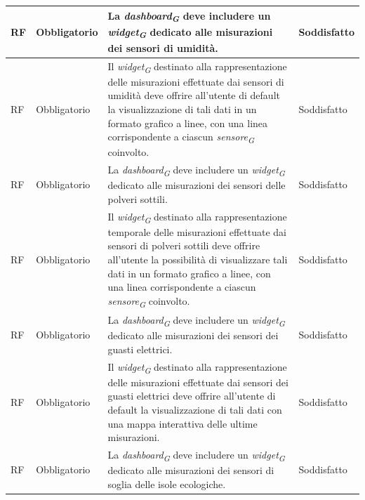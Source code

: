 \begin{longtable}{|C{1.5cm}|C{2cm}|L{5cm}|C{2cm}|}
    \hline
     RF & Obbligatorio & La \textit{dashboard}\textsubscript{\textit{G}} deve includere un \textit{widget}\textsubscript{\textit{G}} dedicato alle misurazioni dei sensori di umidità.& Soddisfatto \\
    \hline
     RF & Obbligatorio &Il \textit{widget}\textsubscript{\textit{G}} destinato alla rappresentazione delle misurazioni effettuate dai sensori di umidità deve offrire all'utente di default la visualizzazione di tali dati in un formato grafico a linee, con una linea corrispondente a ciascun \textit{sensore}\textsubscript{\textit{G}} coinvolto.& Soddisfatto \\
    
    \hline
     RF & Obbligatorio & La \textit{dashboard}\textsubscript{\textit{G}} deve includere un \textit{widget}\textsubscript{\textit{G}} dedicato alle misurazioni dei sensori delle polveri sottili.& Soddisfatto \\
    
    \hline
     RF & Obbligatorio &Il \textit{widget}\textsubscript{\textit{G}} destinato alla rappresentazione temporale delle misurazioni effettuate dai sensori di polveri sottili deve offrire all'utente la possibilità di visualizzare tali dati in un formato grafico a linee, con una linea corrispondente a ciascun \textit{sensore}\textsubscript{\textit{G}} coinvolto.& Soddisfatto \\
    
    \hline
     RF & Obbligatorio & La \textit{dashboard}\textsubscript{\textit{G}} deve includere un \textit{widget}\textsubscript{\textit{G}} dedicato alle misurazioni dei sensori dei guasti elettrici.& Soddisfatto \\
    
    \hline
     RF & Obbligatorio &Il \textit{widget}\textsubscript{\textit{G}} destinato alla rappresentazione delle misurazioni effettuate dai sensori dei guasti elettrici deve offrire all'utente di default la visualizzazione di tali dati con una mappa interattiva delle ultime misurazioni.  & Soddisfatto \\
    
    \hline
     RF & Obbligatorio & La \textit{dashboard}\textsubscript{\textit{G}} deve includere un \textit{widget}\textsubscript{\textit{G}} dedicato alle misurazioni dei sensori di soglia delle isole ecologiche.& Soddisfatto \\
    

\end{longtable}
